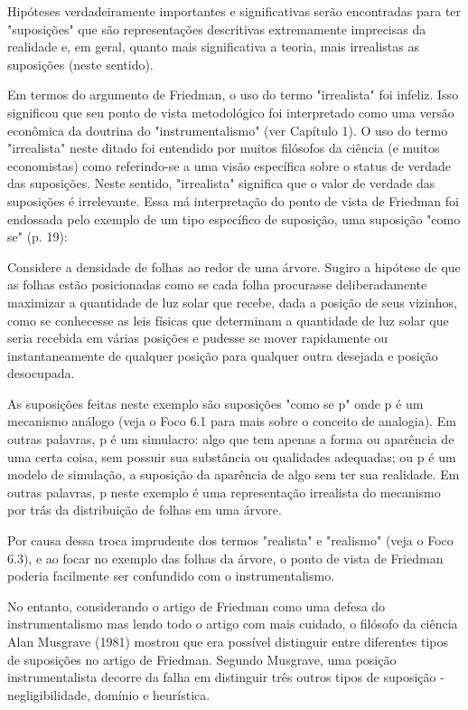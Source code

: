 \documentclass[12pt]{article}
\begin{document}
Hipóteses verdadeiramente importantes e significativas serão encontradas para ter "suposições" que são representações descritivas extremamente imprecisas da realidade e, em geral, quanto mais significativa a teoria, mais irrealistas as suposições (neste sentido).

Em termos do argumento de Friedman, o uso do termo "irrealista" foi infeliz. Isso significou que seu ponto de vista metodológico foi interpretado como uma versão econômica da doutrina do "instrumentalismo" (ver Capítulo 1). O uso do termo "irrealista" neste ditado foi entendido por muitos filósofos da ciência (e muitos economistas) como referindo-se a uma visão específica sobre o status de verdade das suposições. Neste sentido, "irrealista" significa que o valor de verdade das suposições é irrelevante. Essa má interpretação do ponto de vista de Friedman foi endossada pelo exemplo de um tipo específico de suposição, uma suposição "como se" (p. 19):

Considere a densidade de folhas ao redor de uma árvore. Sugiro a hipótese
de que as folhas estão posicionadas como se cada folha procurasse deliberadamente
maximizar a quantidade de luz solar que recebe, dada a posição de seus
vizinhos, como se conhecesse as leis físicas que determinam a quantidade de
luz solar que seria recebida em várias posições e pudesse se mover
rapidamente ou instantaneamente de qualquer posição para qualquer outra desejada
e posição desocupada.

As suposições feitas neste exemplo são suposições "como se p" onde
p é um mecanismo análogo (veja o Foco 6.1 para mais sobre o conceito de
analogia). Em outras palavras, p é um simulacro: algo que tem apenas a
forma ou aparência de uma certa coisa, sem possuir sua substância ou
qualidades adequadas; ou p é um modelo de simulação, a suposição da aparência
de algo sem ter sua realidade. Em outras palavras, p neste
exemplo é uma representação irrealista do mecanismo por trás da distribuição
de folhas em uma árvore.

Por causa dessa troca imprudente dos termos "realista" e
"realismo" (veja o Foco 6.3), e ao focar no exemplo das folhas da árvore,
o ponto de vista de Friedman poderia facilmente ser confundido com o instrumentalismo.

No entanto, considerando o artigo de Friedman como uma defesa do instrumentalismo
mas lendo todo o artigo com mais cuidado, o filósofo da ciência Alan
Musgrave (1981) mostrou que era possível distinguir entre diferentes
tipos de suposições no artigo de Friedman. Segundo Musgrave,
uma posição instrumentalista decorre da falha em distinguir três outros
tipos de suposição - negligibilidade, domínio e heurística.
\end{document}
